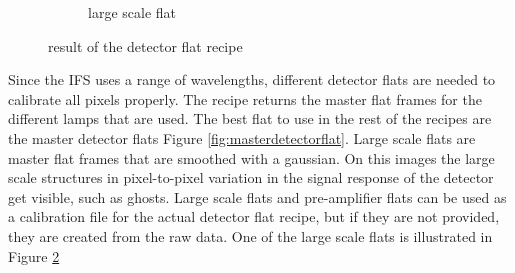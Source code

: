 \documentclass[twoside,single,12pt]{lion-msc}
\begin{document}
\begin{figure}[!b]
\begin{subfigure}{.48\textwidth}
  \caption{large scale flat}
  \label{fig:largescaleflat}
\end{subfigure}
\caption{result of the detector flat recipe}
\end{figure}

Since the IFS uses a range of wavelengths, different detector flats are needed to calibrate all pixels properly. The recipe returns the master flat frames for the different lamps that are used. The best flat to use in the rest of the recipes are the master detector flats Figure \ref{fig:masterdetectorflat}. Large scale flats are master flat frames that are smoothed with a gaussian. On this images the large scale structures in pixel-to-pixel variation in the signal response of the detector get visible, such as ghosts. Large scale flats and pre-amplifier flats can be used as a calibration file for the actual detector flat recipe, but if they are not provided, they are created from the raw data. One of the large scale flats is illustrated in Figure \ref{fig:largescaleflat}
\end{document}

